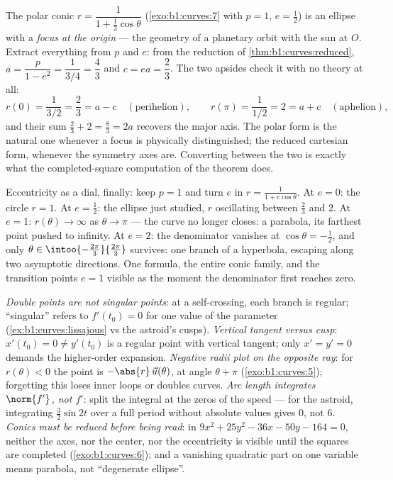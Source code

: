 \begin{example}
\label{ex:b1:curves:orbit}
The polar conic $r = \dfrac{1}{1 + \frac12\cos\theta}$
(\cref{exo:b1:curves:7} with $p = 1$, $e = \frac12$) is an
ellipse with a \emph{focus at the origin} --- the geometry of a
planetary orbit with the sun at $O$. Extract everything from
$p$ and $e$: from the reduction of
\cref{thm:b1:curves:reduced}, $a = \dfrac{p}{1 - e^2} =
\dfrac{1}{3/4} = \dfrac43$ and $c = ea = \dfrac23$. The two
apsides check it with no theory at all:
\[
r(0) = \frac{1}{3/2} = \frac23 = a - c
\quad (\text{perihelion}),
\qquad
r(\pi) = \frac{1}{1/2} = 2 = a + c
\quad (\text{aphelion}),
\]
and their sum $\frac23 + 2 = \frac83 = 2a$ recovers the major
axis. The polar form is the natural one whenever a focus is
physically distinguished; the reduced cartesian form, whenever
the symmetry axes are. Converting between the two is exactly
what the completed-square computation of the theorem does.

Eccentricity as a dial, finally: keep $p = 1$ and turn $e$ in $r
= \frac{1}{1 + e\cos\theta}$. At $e = 0$: the circle $r = 1$. At
$e = \frac12$: the ellipse just studied, $r$ oscillating between
$\frac23$ and $2$. At $e = 1$: $r(\theta) \to \infty$ as $\theta
\to \pi$ --- the curve no longer closes: a parabola, its
farthest point pushed to infinity. At $e = 2$: the denominator
vanishes at $\cos\theta = -\frac12$, and only $\theta \in
\intoo{-\frac{2\pi}3}{\frac{2\pi}3}$ survives: one branch of a
hyperbola, escaping along two asymptotic directions. One
formula, the entire conic family, and the transition points $e =
1$ visible as the moment the denominator first reaches zero.
\end{example}

\begin{remark}
\label{rem:b1:curves:pitfalls}
\emph{Double points are not singular points}: at a
self-crossing, each branch is regular; ``singular'' refers to
$f'(t_0) = 0$ for one value of the parameter
(\cref{ex:b1:curves:lissajous} vs the astroid's cusps).
\emph{Vertical tangent versus cusp}: $x'(t_0) = 0 \neq y'(t_0)$
is a regular point with vertical tangent; only $x' = y' = 0$
demands the higher-order expansion.
\emph{Negative radii plot on the opposite ray}: for $r(\theta) <
0$ the point is $-\abs{r}\,\vec u(\theta)$, at angle $\theta +
\pi$ (\cref{exo:b1:curves:5}); forgetting this loses inner loops
or doubles curves.
\emph{Arc length integrates $\norm{f'}$, not $f'$}: split the
integral at the zeros of the speed --- for the astroid,
integrating $\frac32\sin 2t$ over a full period without absolute
values gives $0$, not $6$.
\emph{Conics must be reduced before being read}: in $9x^2 +
25y^2 - 36x - 50y - 164 = 0$, neither the axes, nor the center,
nor the eccentricity is visible until the squares are completed
(\cref{exo:b1:curves:6}); and a vanishing quadratic part on one
variable means parabola, not ``degenerate ellipse''.
\end{remark}

